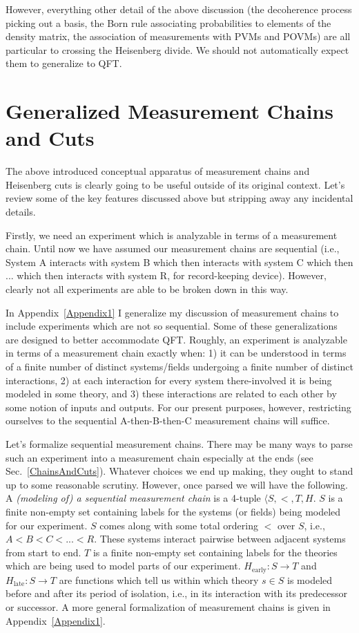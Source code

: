 \documentclass[12pt,prd,superscriptaddress,floatfix,amsmath,amssymb,amsfonts,nofootinbib]{revtex4-2}
\begin{document}
However, everything other detail of the above discussion (the decoherence process picking out a basis, the Born rule associating probabilities to elements of the density matrix, the association of measurements with PVMs and POVMs) are all particular to crossing the Heisenberg divide. We should not automatically expect them to generalize to QFT.

\section{Generalized Measurement Chains and Cuts}\label{GenChainsAndCuts}
The above introduced conceptual apparatus of measurement chains and Heisenberg cuts is clearly going to be useful outside of its original context. Let's review some of the key features discussed above but stripping away any incidental details.

Firstly, we need an experiment which is analyzable in terms of a measurement chain. Until now we have assumed our measurement chains are sequential (i.e., System A interacts with system B which then interacts with system C which then ... which then interacts with system R, for record-keeping device). However, clearly not all experiments are able to be broken down in this way. 

In Appendix~\ref{Appendix1} I generalize my discussion of measurement chains to include experiments which are not so sequential. Some of these generalizations are designed to better accommodate QFT. Roughly, an experiment is analyzable in terms of a measurement chain exactly when: 1) it can be understood in terms of a finite number of distinct systems/fields undergoing a finite number of distinct interactions, 2) at each interaction for every system there-involved it is being modeled in some theory, and 3) these interactions are related to each other by some notion of inputs and outputs. For our present purposes, however, restricting ourselves to the sequential A-then-B-then-C measurement chains will suffice.

Let's formalize sequential measurement chains. There may be many ways to parse such an experiment into a measurement chain especially at the ends (see Sec.~\ref{ChainsAndCuts}). Whatever choices we end up making, they ought to stand up to some reasonable scrutiny. However, once parsed we will have the following. A \textit{(modeling of) a sequential measurement chain} is a 4-tuple \mbox{$\langle S,<,T,H$}. $S$ is a finite non-empty set containing labels for the systems (or fields) being modeled for our experiment. $S$ comes along with some total ordering $<$ over $S$, i.e.,  $A<B<C<...<R$. These systems interact pairwise between adjacent systems from start to end. $T$ is a finite non-empty set containing labels for the theories which are being used to model parts of our experiment. $H_\text{early}:S\to T$ and $H_\text{late}:S\to T$ are functions which tell us within which theory $s\in S$ is modeled before and after its period of isolation, i.e., in its interaction with its predecessor or successor. A more general formalization of measurement chains is given in Appendix~\ref{Appendix1}.
\end{document}
